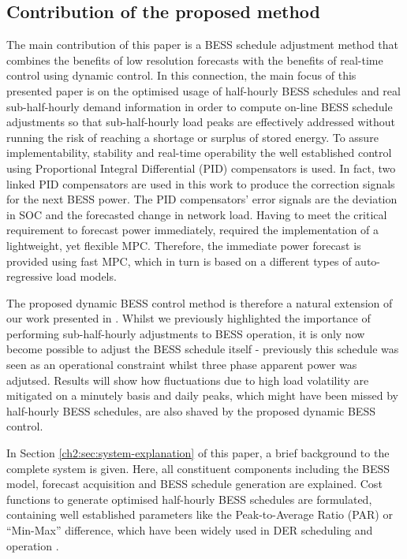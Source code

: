 \subsection{Contribution of the proposed method}

The main contribution of this paper is a BESS schedule adjustment method that combines the benefits of low resolution forecasts with the benefits of real-time control using dynamic control.
In this connection, the main focus of this presented paper is on the optimised usage of half-hourly BESS schedules and real sub-half-hourly demand information in order to compute on-line BESS schedule adjustments so that sub-half-hourly load peaks are effectively addressed without running the risk of reaching a shortage or surplus of stored energy.
To assure implementability, stability and real-time operability the well established control using Proportional Integral Differential (PID) compensators is used.
In fact, two linked PID compensators are used in this work to produce the correction signals for the next BESS power.
The PID compensators' error signals are the deviation in SOC and the forecasted change in network load.
Having to meet the critical requirement to forecast power immediately, required the implementation of a lightweight, yet flexible MPC.
Therefore, the immediate power forecast is provided using fast MPC, which in turn is based on a different types of auto-regressive load models.

The proposed dynamic BESS control method is therefore a natural extension of our work presented in \cite{Zangs2016}.
Whilst we previously highlighted the importance of performing sub-half-hourly adjustments to BESS operation, it is only now become possible to adjust the BESS schedule itself - previously this schedule was seen as an operational constraint whilst three phase apparent power was adjutsed.
Results will show how fluctuations due to high load volatility are mitigated on a minutely basis and daily peaks, which might have been missed by half-hourly BESS schedules, are also shaved by the proposed dynamic BESS control.

In Section \ref{ch2:sec:system-explanation} of this paper, a brief background to the complete system is given.
Here, all constituent components including the BESS model, forecast acquisition and BESS schedule generation are explained.
Cost functions to generate optimised half-hourly BESS schedules are formulated, containing well established parameters like the Peak-to-Average Ratio (PAR) or ``Min-Max'' difference, which have been widely used in DER scheduling and operation \cite{Liu2014, Deng2015, Bayram2015, Zangs2016a}.

